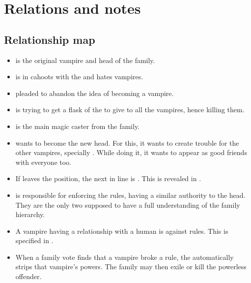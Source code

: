 \clearpage
\section{Relations and notes}

\RelationshipSummary

\subsection{Relationship map}
\begin{itemize}

  \item {} is the original vampire and head of the family.

  \item {} is in cahoots with the  and hates vampires.

  \item {} pleaded  to abandon the idea of becoming a vampire.

  \item {} is trying to get a flask of the  to give to all the vampires, hence killing them.

  \item {} is the main magic caster from the family.
  
  \item {} wants to become the new head. For this, it wants to create trouble for the other vampires, specially . While doing it, it wants to appear as good friends with everyone too.
  
  \item If  leaves the position, the next in line is . This is revealed in .

  \item  {} is responsible for enforcing the rules, having a similar authority to the head. They are the only two supposed to have a full understanding of the family hierarchy.
  
  \item A vampire having a relationship with a human is against rules. This is specified in .
  
  \item When a family vote finds that a vampire broke a rule, the  automatically strips that vampire's powers. The family may then exile or kill the powerless offender.
  

\end{itemize}
